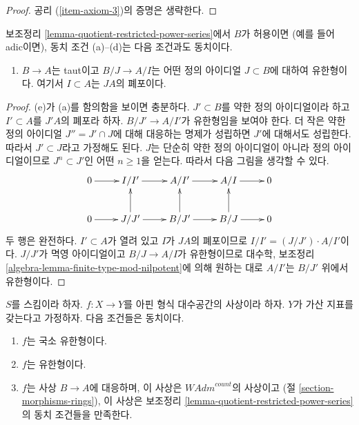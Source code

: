 \begin{proof}
\medskip\noindent
공리 (\ref{item-axiom-3})의 증명은 생략한다.
\end{proof}

\begin{lemma}
\label{lemma-quotient-restricted-power-series-admissible}
보조정리 \ref{lemma-quotient-restricted-power-series}에서 $B$가 허용이면
(예를 들어 adic이면), 동치 조건 (a)--(d)는 다음 조건과도 동치이다.
\begin{enumerate}
\item[(e)] $B \to A$는 taut이고 $B/J \to A/I$는 어떤 정의 아이디얼
$J \subset B$에 대하여 유한형이다. 여기서 $I \subset A$는
$JA$의 폐포이다.
\end{enumerate}
\end{lemma}

\begin{proof}
(e)가 (a)를 함의함을 보이면 충분하다. $J' \subset B$를 약한 정의
아이디얼이라 하고 $I' \subset A$를 $J'A$의 폐포라 하자.
$B/J' \to A/I'$가 유한형임을 보여야 한다. 더 작은 약한 정의
아이디얼 $J'' = J' \cap J$에 대해 대응하는 명제가 성립하면 $J'$에
대해서도 성립한다. 따라서 $J' \subset J$라고 가정해도 된다.
$J$는 단순히 약한 정의 아이디얼이 아니라 정의 아이디얼이므로
$J^n \subset J'$인 어떤 $n \geq 1$을 얻는다. 따라서 다음 그림을
생각할 수 있다.
$$
\xymatrix{
0 \ar[r] & I/I' \ar[r] & A/I' \ar[r] & A/I \ar[r] & 0 \\
0 \ar[r] & J/J' \ar[r] \ar[u] & B/J' \ar[r] \ar[u] & B/J \ar[r] \ar[u] & 0
}
$$
두 행은 완전하다. $I' \subset A$가 열려 있고 $I$가 $J A$의
폐포이므로 $I/I' = (J/J') \cdot A/I'$이다. $J/J'$가 멱영
아이디얼이고 $B/J \to A/I$가 유한형이므로 대수학, 보조정리
\ref{algebra-lemma-finite-type-mod-nilpotent}에 의해 원하는 대로
$A/I'$는 $B/J'$ 위에서 유한형이다.
\end{proof}

\begin{lemma}
\label{lemma-representable-affine-finite-type}
$S$를 스킴이라 하자. $f : X \to Y$를 아핀 형식 대수공간의
사상이라 하자. $Y$가 가산 지표를 갖는다고 가정하자. 다음 조건들은
동치이다.
\begin{enumerate}
\item $f$는 국소 유한형이다.
\item $f$는 유한형이다.
\item $f$는 사상 $B \to A$에 대응하며, 이 사상은 $\textit{WAdm}^{count}$의 사상이고
(절 \ref{section-morphisms-rings}), 이 사상은 보조정리
\ref{lemma-quotient-restricted-power-series}의 동치 조건들을 만족한다.
\end{enumerate}
\end{lemma}

